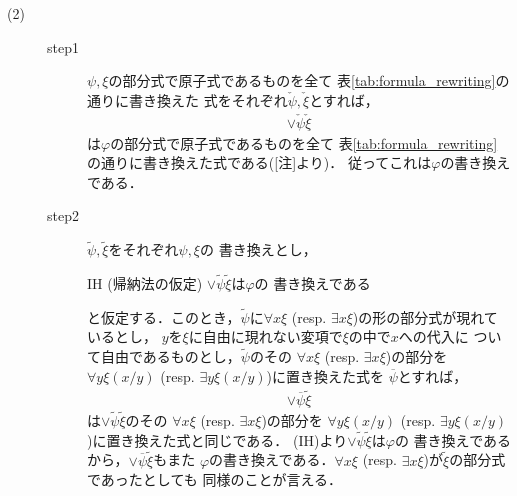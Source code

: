 \begin{metaprf}
\begin{description}
			\item[(2)]		
				\begin{description}
					\item[step1]
						$\psi,\xi$の部分式で原子式であるものを全て
						表\ref{tab:formula_rewriting}の通りに書き換えた
						式をそれぞれ$\check{\psi},\check{\xi}$とすれば，
						\begin{align}
							\vee \check{\psi} \check{\xi}
						\end{align}
						は$\varphi$の部分式で原子式であるものを全て
						表\ref{tab:formula_rewriting}の通りに書き換えた式である([注]より)．
						従ってこれは$\varphi$の書き換えである．
								
					\item[step2]
						$\widetilde{\psi},\widetilde{\xi}$をそれぞれ$\psi,\xi$の
						書き換えとし，
						\begin{itembox}[l]{IH (帰納法の仮定)}
							$\vee \widetilde{\psi} \widetilde{\xi}$は$\varphi$の
							書き換えである
						\end{itembox}
						と仮定する．このとき，$\widetilde{\psi}$に$\forall x \xi$ 
						(resp. $\exists x \xi$)の形の部分式が現れているとし，
						$y$を$\xi$に自由に現れない変項で$\xi$の中で$x$への代入に
						ついて自由であるものとし，$\widetilde{\psi}$のその
						$\forall x \xi$ (resp. $\exists x \xi$)の部分を
						$\forall y \xi(x/y)$
						(resp. $\exists y \xi(x/y)$)に置き換えた式を
						$\overline{\psi}$とすれば，
						\begin{align}
							\vee \overline{\psi} \widetilde{\xi}
						\end{align}
						は$\vee \widetilde{\psi} \widetilde{\xi}$のその
						$\forall x \xi$ (resp. $\exists x \xi$)の部分を
						$\forall y \xi(x/y)$
						(resp. $\exists y \xi(x/y)$)に置き換えた式と同じである．
						(IH)より$\vee \widetilde{\psi} \widetilde{\xi}$は$\varphi$の
						書き換えであるから，$\vee \overline{\psi} \widetilde{\xi}$もまた
						$\varphi$の書き換えである．$\forall x \xi$ 
						(resp. $\exists x \xi$)が$\widetilde{\xi}$の部分式であったとしても
						同様のことが言える．
						\QED
				\end{description}
		\end{description}
	\end{metaprf}
	
